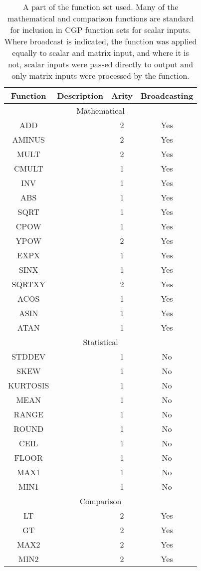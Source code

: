\documentclass[sigconf,screen]{acmart}\settopmatter{printfolios=true,printacmref=false}
\begin{document}
\begin{table}[t]
  \begin{tabular}{|c|c|c|c|}
    \hline
Function & Description & Arity & Broadcasting\\\hline
\multicolumn{4}{|c|}{Mathematical}\\\hline
ADD &  & 2 & Yes\\
AMINUS &  & 2 & Yes\\
MULT &  & 2 & Yes\\
CMULT &  & 1 & Yes\\
INV &  & 1 & Yes\\
ABS &  & 1 & Yes\\
SQRT &  & 1 & Yes\\
CPOW &  & 1 & Yes\\
YPOW &  & 2 & Yes\\
EXPX &  & 1 & Yes\\
SINX &  & 1 & Yes\\
SQRTXY &  & 2 & Yes\\
ACOS &  & 1 & Yes\\
ASIN &  & 1 & Yes\\
ATAN &  & 1 & Yes\\
\hline
\multicolumn{4}{|c|}{Statistical}\\\hline
STDDEV &  & 1 & No\\
SKEW &  & 1 & No\\
KURTOSIS &  & 1 & No\\
MEAN &  & 1 & No\\
RANGE &  & 1 & No\\
ROUND &  & 1 & No\\
CEIL &  & 1 & No\\
FLOOR &  & 1 & No\\
MAX1 &  & 1 & No\\
MIN1 &  & 1 & No\\
\hline
\multicolumn{4}{|c|}{Comparison}\\\hline
LT &  & 2 & Yes\\
GT &  & 2 & Yes\\
MAX2 &  & 2 & Yes\\
MIN2 &  & 2 & Yes\\
\hline
  \end{tabular}
  \caption{A part of the function set used. Many of the mathematical and
    comparison functions are standard for inclusion in CGP function sets for
    scalar inputs. Where broadcast is indicated, the function was applied
    equally to scalar and matrix input, and where it is not, scalar inputs were
    passed directly to output and only matrix inputs were processed by the
    function.}
  \label{tab:functions}
\end{table}
\end{document}
